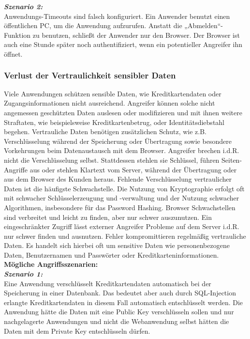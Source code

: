 \textbf{\textit{Szenario 2:}}\\
Anwendungs-Timeouts sind falsch konfiguriert. Ein
Anwender benutzt einen öffentlichen PC, um die Anwendung
aufzurufen. Anstatt die „Abmelden“-Funktion zu benutzen, schließt
der Anwender nur den Browser. Der Browser ist auch eine Stunde
später noch authentifiziert, wenn ein potentieller Angreifer ihn
öffnet\cite[8]{owasp17top10}.

\subsubsection{Verlust der Vertraulichkeit sensibler Daten}

Viele Anwendungen schützen sensible Daten, wie Kreditkartendaten oder Zugangsinformationen nicht ausreichend. Angreifer können solche nicht angemessen geschützten Daten auslesen oder modifizieren und mit ihnen weitere Straftaten, wie beispielsweise Kreditkartenbetrug, oder Identitätsdiebstahl begehen. Vertrauliche Daten benötigen zusätzlichen Schutz, wie z.B. Verschlüsselung während der Speicherung oder Übertragung sowie besondere Vorkehrungen beim Datenaustausch mit dem Browser\cite[6]{owasp17top10}. Angreifer brechen i.d.R. nicht die Verschlüsselung selbst. Stattdessen stehlen sie Schlüssel, führen
Seiten-Angriffe aus oder stehlen Klartext vom Server, während der Übertragung oder aus dem Browser des Kunden heraus. Fehlende Verschlüsselung vertraulicher
Daten ist die häufigste Schwachstelle. Die Nutzung von Kryptographie erfolgt oft mit schwacher Schlüsselerzeugung und -verwaltung und der Nutzung schwacher Algorithmen, insbesondere für das Password Hashing. Browser Schwachstellen sind verbreitet und leicht zu finden, aber nur schwer auszunutzen. Ein eingeschränkter Zugriff lässt externer Angreifer Probleme auf dem Server i.d.R. nur schwer finden und ausnutzen. Fehler kompromittieren regelmäßig vertrauliche Daten. Es handelt sich hierbei oft um sensitive Daten wie personenbezogene Daten, Benutzernamen und Passwörter oder Kreditkarteninformationen\cite[9]{owasp17top10}.\\

\textbf{Mögliche Angriffsszenarien:}\\

\textbf{\textit{Szenario 1:}}\\
Eine Anwendung verschlüsselt Kreditkartendaten
automatisch bei der Speicherung in einer Datenbank. Das
bedeutet aber auch durch SQL-Injection erlangte Kreditkartendaten
in diesem Fall automatisch entschlüsselt werden.
Die Anwendung hätte die Daten mit eine Public Key
verschlüsseln sollen und nur nachgelagerte Anwendungen
und nicht die Webanwendung selbst hätten die Daten mit
dem Private Key entschlüsseln dürfen\cite[9]{owasp17top10}.\\

